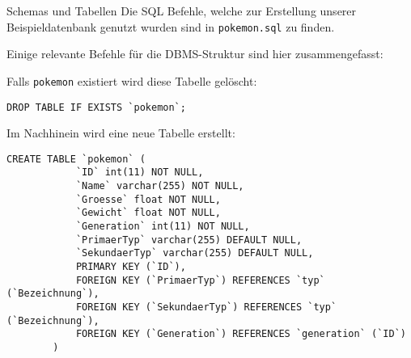 \begin{example}{Schemas und Tabellen}
    Die SQL Befehle, welche zur Erstellung unserer Beispieldatenbank genutzt wurden sind in \texttt{pokemon.sql} zu finden.

    Einige relevante Befehle für die DBMS-Struktur sind hier zusammengefasst:

    Falls \texttt{pokemon} existiert wird diese Tabelle gelöscht:

    \begin{lstlisting}[language=mysql]
        DROP TABLE IF EXISTS `pokemon`;
    \end{lstlisting}

    Im Nachhinein wird eine neue Tabelle erstellt:

    \begin{lstlisting}[language=mysql]
        CREATE TABLE `pokemon` (
            `ID` int(11) NOT NULL,
            `Name` varchar(255) NOT NULL,
            `Groesse` float NOT NULL,
            `Gewicht` float NOT NULL,
            `Generation` int(11) NOT NULL,
            `PrimaerTyp` varchar(255) DEFAULT NULL,
            `SekundaerTyp` varchar(255) DEFAULT NULL,
            PRIMARY KEY (`ID`),
            FOREIGN KEY (`PrimaerTyp`) REFERENCES `typ` (`Bezeichnung`),
            FOREIGN KEY (`SekundaerTyp`) REFERENCES `typ` (`Bezeichnung`),
            FOREIGN KEY (`Generation`) REFERENCES `generation` (`ID`)
        )
    \end{lstlisting}
\end{example}